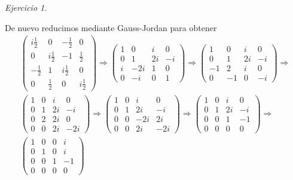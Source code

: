 \documentclass[11pt,a4paper]{article}
\theoremstyle{definition}
\theoremstyle{remark}
\newtheorem{exc}{Ejercicio}
\begin{document}
\begin{exc}
\begin{enumerate}
					De nuevo reducimos mediante Gauss-Jordan para obtener 
					\begin{multline}
					\begin{pmatrix}
			    	i\frac{1}{2} & 0 & -\frac{1}{2} & 0
			    	\\ 0 & i\frac{1}{2} & -1 & \frac{1}{2} 
			    	\\ -\frac{1}{2} & 1 & i\frac{1}{2} & 0
			    	\\ 0 & \frac{1}{2} & 0 & i\frac{1}{2}
			    	\end{pmatrix}  \Rightarrow
			    	\begin{pmatrix}
			    	1 & 0 & i & 0
			    	\\ 0 & 1 & 2i & -i 
			    	\\ i & -2i & 1 & 0
			    	\\ 0 & -i & 0 & 1
			    	\end{pmatrix}  \Rightarrow
			    	\begin{pmatrix}
			    	1 & 0 & i & 0
			    	\\ 0 & 1 & 2i & -i 
			    	\\ -1 & 2 & i & 0
			    	\\ 0 & -1 & 0 & -i
			    	\end{pmatrix}  \Rightarrow \\
			    	\begin{pmatrix}
			    	1 & 0 & i & 0
			    	\\ 0 & 1 & 2i & -i 
			    	\\ 0 & 2 & 2i & 0
			    	\\ 0 & 0 & 2i & -2i
			    	\end{pmatrix}  \Rightarrow
			    	\nonumber
			    	\begin{pmatrix}
			    	1 & 0 & i & 0
			    	\\ 0 & 1 & 2i & -i 
			    	\\ 0 & 0 & -2i & 2i
			    	\\ 0 & 0 & 2i & -2i
			    	\end{pmatrix}  \Rightarrow
			    	\begin{pmatrix}
			    	1 & 0 & i & 0
			    	\\ 0 & 1 & 2i & -i 
			    	\\ 0 & 0 & 1 & -1
			    	\\ 0 & 0 & 0 & 0
			    	\end{pmatrix}\Rightarrow
			    	\\\begin{pmatrix}
			    	1 & 0 & 0 & i
			    	\\ 0 & 1 & 0 & i 
			    	\\ 0 & 0 & 1 & -1
			    	\\ 0 & 0 & 0 & 0
			    	\end{pmatrix}
					\end{multline}
					

\end{enumerate}
\end{exc}
\end{document}
